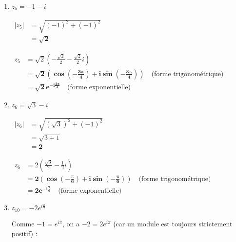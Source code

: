 \documentclass[12pt,a4paper]{article}
\begin{document}
\begin{enumerate}
    $
    \begin{aligned}
        z_4 &= 10\left(-\frac{1}{2} + \frac{\sqrt{3}}{2}i\right)\\
        &= \mathbf{10\left(\cos\frac{2\pi}{3} + i\sin\frac{2\pi}{3}\right)} \quad \text{(forme trigonométrique)}\\
        &= \mathbf{10e^{i\frac{2\pi}{3}}} \quad \text{(forme exponentielle)}
    \end{aligned}
    $

    \item $z_5 = -1 - i$
    
    $
    \begin{aligned}
        |z_5| &= \sqrt{(-1)^2 + (-1)^2}\\
        &= \mathbf{\sqrt{2}}
    \end{aligned}
    $
    
    $
    \begin{aligned}
        z_5 &= \sqrt{2}\left(-\frac{\sqrt{2}}{2} - \frac{\sqrt{2}}{2}i\right)\\
        &= \mathbf{\sqrt{2}\left(\cos\left(-\frac{3\pi}{4}\right) + i\sin\left(-\frac{3\pi}{4}\right)\right)} \quad \text{(forme trigonométrique)}\\
        &= \mathbf{\sqrt{2}e^{-i\frac{3\pi}{4}}} \quad \text{(forme exponentielle)}
    \end{aligned}
    $

    \item $z_6 = \sqrt{3} - i$
    
    $
    \begin{aligned}
        |z_6| &= \sqrt{(\sqrt{3})^2 + (-1)^2}\\
        &= \sqrt{3 + 1}\\
        &= \mathbf{2}
    \end{aligned}
    $
    
    $
    \begin{aligned}
        z_6 &= 2\left(\frac{\sqrt{3}}{2} - \frac{1}{2}i\right)\\
        &= \mathbf{2\left(\cos\left(-\frac{\pi}{6}\right) + i\sin\left(-\frac{\pi}{6}\right)\right)} \quad \text{(forme trigonométrique)}\\
        &= \mathbf{2e^{-i\frac{\pi}{6}}} \quad \text{(forme exponentielle)}
    \end{aligned}
    $

    \item $z_{10} = -2e^{i\frac{\pi}{2}}$
    
    Comme $-1 = e^{i\pi}$, on a $-2 = 2e^{i\pi}$ (car un module est toujours strictement positif) :
    

\end{enumerate}
\end{document}
